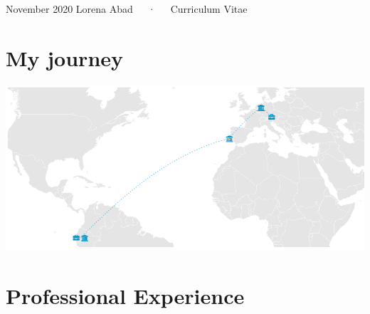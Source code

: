 \documentclass[11pt, a4paper]{awesome-cv}
\begin{document}
\makecvheader

\makecvfooter
  {November 2020}
    {Lorena Abad~~~·~~~Curriculum Vitae}
  {\thepage}





\hypertarget{my-journey}{%
\section{\texorpdfstring{ My journey}{ My journey}}\label{my-journey}}

\begin{center}\includegraphics{CV_files/figure-latex/edu_plot-1} \end{center}

\hypertarget{professional-experience}{%
\section{\texorpdfstring{ Professional Experience}{ Professional Experience}}\label{professional-experience}}
\end{document}
